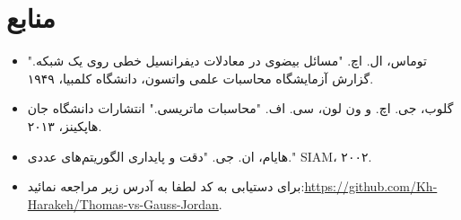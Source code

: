 \documentclass[a4paper,12pt]{article}
\begin{document}
\section*{منابع}
\begin{itemize}
    \item توماس، ال. اچ. "مسائل بیضوی در معادلات دیفرانسیل خطی روی یک شبکه." گزارش آزمایشگاه محاسبات علمی واتسون، دانشگاه کلمبیا، ۱۹۴۹.
    \item گلوب، جی. اچ. و ون لون، سی. اف. "محاسبات ماتریسی." انتشارات دانشگاه جان هاپکینز، ۲۰۱۳.
    \item هایام، ان. جی. "دقت و پایداری الگوریتم‌های عددی." SIAM، ۲۰۰۲.
    \item برای دستیابی به کد لطفا به آدرس زیر مراجعه نمائید:\newline\url{https://github.com/Kh-Harakeh/Thomas-vs-Gauss-Jordan}.
\end{itemize}
\end{document}
